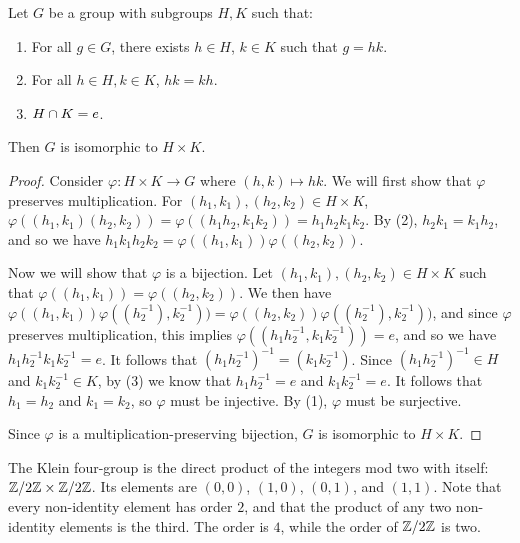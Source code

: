 \begin{thm}\label{subgroups-product}
    Let $G$ be a group with subgroups $H,K$ such that:
    \begin{enumerate}[label=(\arabic*)]
        \item For all $g \in G$, there exists $h \in H$, $k \in K$ such that $g = hk$.
        \item For all $h \in H, k \in K$, $hk = kh$.
        \item $H \cap K = e$.
    \end{enumerate}
    Then $G$ is isomorphic to $H \times K$.
\end{thm}

\begin{proof}
    Consider $\varphi: H \times K \to G$ where $(h, k) \mapsto hk$. We will first show that $\varphi$ preserves multiplication. For $(h_1, k_1), (h_2, k_2) \in H \times K$, $\varphi\left((h_1,k_1)(h_2,k_2)\right) = \varphi\left((h_1h_2,k_1k_2)\right) = h_1h_2k_1k_2$. By (2), $h_2k_1 = k_1h_2$, and so we have $h_1k_1h_2k_2 = \varphi((h_1, k_1))\varphi((h_2, k_2))$.

    Now we will show that $\varphi$ is a bijection. Let $(h_1,k_1), (h_2,k_2) \in H \times K$ such that $\varphi((h_1,k_1)) = \varphi((h_2,k_2))$. We then have $\varphi((h_1,k_1))\varphi((h_2^{-1}),k_2^{-1})) = \varphi((h_2,k_2))\varphi((h_2^{-1}),k_2^{-1}))$, and since $\varphi$ preserves multiplication, this implies $\varphi((h_1h_2^{-1},k_1k_2^{-1})) = e$, and so we have $h_1h_2^{-1}k_1k_2^{-1} = e$. It follows that $\left(h_1h_2^{-1}\right)^{-1} = \left(k_1k_2^{-1}\right)$. Since $\left(h_1h_2^{-1}\right)^{-1} \in H$ and $k_1k_2^{-1} \in K$, by (3) we know that $h_1h_2^{-1} = e$ and $k_1k_2^{-1} = e$. It follows that $h_1 = h_2$ and $k_1 = k_2$, so $\varphi$ must be injective. By (1), $\varphi$ must be surjective.

    Since $\varphi$ is a multiplication-preserving bijection, $G$ is isomorphic to $H \times K$.
\end{proof}

\begin{exmp}The Klein four-group is the direct product of the integers mod two with itself: $\mathbb{Z}/2\mathbb{Z} \times \mathbb{Z}/2\mathbb{Z}$. Its elements are $(0, 0)$, $(1, 0)$, $(0, 1)$, and $(1, 1)$. Note that every non-identity element has order $2$, and that the product of any two non-identity elements is the third. The order is $4$, while the order of $\mathbb{Z}/2\mathbb{Z}$ is two.
\end{exmp}

